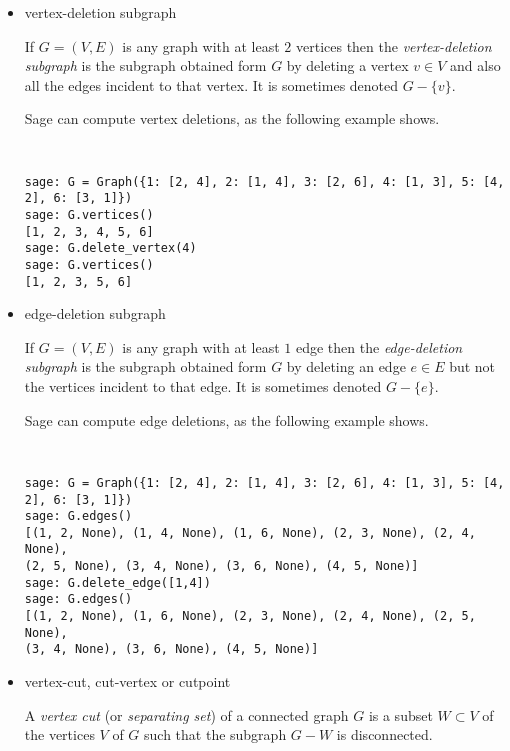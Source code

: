 \begin{itemize}
\item vertex-deletion subgraph

If $G=(V,E)$ is any graph with at least $2$ vertices then the
{\it vertex-deletion subgraph} is the subgraph obtained form $G$ by
deleting a vertex $v\in V$ and also all the edges incident to that vertex.
It is sometimes denoted $G-\{v\}$.


Sage can compute vertex deletions, as the following example shows.

%
\begin{center}
\fontsize{9pt}{9pt}
\selectfont
\tt
\begin{lstlisting}
sage: G = Graph({1: [2, 4], 2: [1, 4], 3: [2, 6], 4: [1, 3], 5: [4, 2], 6: [3, 1]})
sage: G.vertices()
[1, 2, 3, 4, 5, 6]
sage: G.delete_vertex(4)
sage: G.vertices()
[1, 2, 3, 5, 6]
\end{lstlisting}
\end{center}
%

\item edge-deletion subgraph

If $G=(V,E)$ is any graph with at least $1$ edge then the
{\it edge-deletion subgraph} is the subgraph obtained form $G$ by
deleting an edge $e\in E$ but not the vertices incident to that edge.
It is sometimes denoted $G-\{e\}$.

Sage can compute edge deletions, as the following example shows.

%
\begin{center}
\fontsize{9pt}{9pt}
\selectfont
\tt
\begin{lstlisting}
sage: G = Graph({1: [2, 4], 2: [1, 4], 3: [2, 6], 4: [1, 3], 5: [4, 2], 6: [3, 1]})
sage: G.edges()
[(1, 2, None), (1, 4, None), (1, 6, None), (2, 3, None), (2, 4, None),
(2, 5, None), (3, 4, None), (3, 6, None), (4, 5, None)]
sage: G.delete_edge([1,4])
sage: G.edges()
[(1, 2, None), (1, 6, None), (2, 3, None), (2, 4, None), (2, 5, None),
(3, 4, None), (3, 6, None), (4, 5, None)]
\end{lstlisting}
\end{center}
%

\item vertex-cut, cut-vertex or cutpoint

A {\it vertex cut} (or {\it separating set}) of a connected graph $G$
is a subset $W\subset V$ of the vertices $V$ of $G$ such that the subgraph
$G-W$ is disconnected.


\end{itemize}
